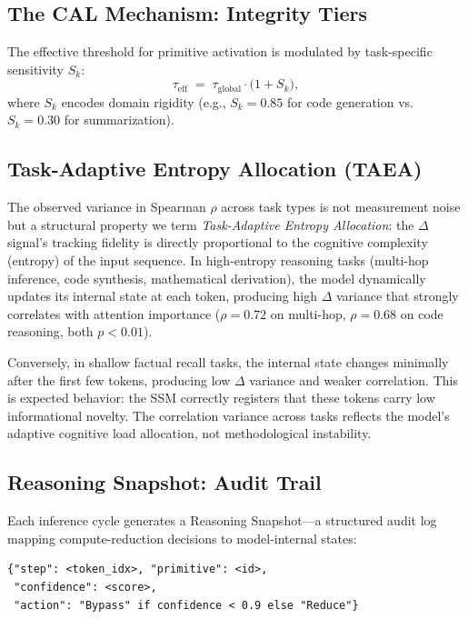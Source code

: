 \documentclass[11pt]{article}
\newcommand{\dsig}{\Delta}
\begin{document}
\subsection{The CAL Mechanism: Integrity Tiers}
The effective threshold for primitive activation is modulated by task-specific
sensitivity $S_k$:
\begin{equation}\label{eq:cal}
  \tau_{\mathrm{eff}} \;=\; \tau_{\mathrm{global}} \cdot \bigl(1 + S_k\bigr),
\end{equation}
where $S_k$ encodes domain rigidity (e.g., $S_k{=}0.85$ for code generation
vs.\ $S_k{=}0.30$ for summarization).

\subsection{Task-Adaptive Entropy Allocation (TAEA)}
The observed variance in Spearman $\rho$ across task types is not measurement
noise but a structural property we term \emph{Task-Adaptive Entropy
Allocation}: the $\dsig$ signal's tracking fidelity is directly proportional
to the cognitive complexity (entropy) of the input sequence. In high-entropy
reasoning tasks (multi-hop inference, code synthesis, mathematical
derivation), the model dynamically updates its internal state at each token,
producing high $\dsig$ variance that strongly correlates with attention
importance ($\rho{=}0.72$ on multi-hop, $\rho{=}0.68$ on code reasoning, both
$p < 0.01$).

Conversely, in shallow factual recall tasks, the internal state changes
minimally after the first few tokens, producing low $\dsig$ variance and
weaker correlation. This is expected behavior: the SSM correctly registers
that these tokens carry low informational novelty. The correlation variance
across tasks reflects the model's adaptive cognitive load allocation, not
methodological instability.

\subsection{Reasoning Snapshot: Audit Trail}
Each inference cycle generates a Reasoning Snapshot---a structured audit
log mapping compute-reduction decisions to model-internal states:

\begin{lstlisting}
{"step": <token_idx>, "primitive": <id>,
 "confidence": <score>,
 "action": "Bypass" if confidence < 0.9 else "Reduce"}
\end{lstlisting}
\end{document}
